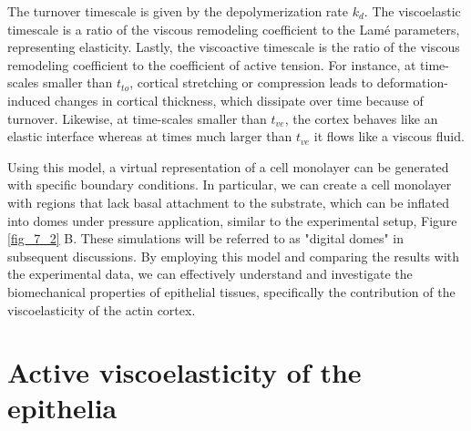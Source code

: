 The turnover timescale is given by the depolymerization rate \(k_{d}\). The viscoelastic timescale is a ratio of the viscous remodeling coefficient to the Lamé parameters, representing elasticity. Lastly, the viscoactive timescale is the ratio of the viscous remodeling coefficient to the coefficient of active tension. For instance, at time-scales smaller than $t_{to}$, cortical stretching or compression leads to deformation-induced changes in cortical thickness, which dissipate over time because of turnover. Likewise, at time-scales smaller than $t_{ve}$, the cortex behaves like an elastic interface whereas at times much larger than $t_{ve}$ it flows like a viscous fluid. 

Using this model, a virtual representation of a cell monolayer can be generated with specific boundary conditions. In particular, we can create a cell monolayer with regions that lack basal attachment to the substrate, which can be inflated into domes under pressure application, similar to the experimental setup, Figure \ref{fig_7_2} B. These simulations will be referred to as "digital domes" in subsequent discussions. By employing this model and comparing the results with the experimental data, we can effectively understand and investigate the biomechanical properties of epithelial tissues, specifically the contribution of the viscoelasticity of the actin cortex.


\hypertarget{active-viscoelasticity-of-the-epithelia}{%
	\section{Active viscoelasticity of the
		epithelia}\label{active-viscoelasticity-of-the-epithelia}}
	
